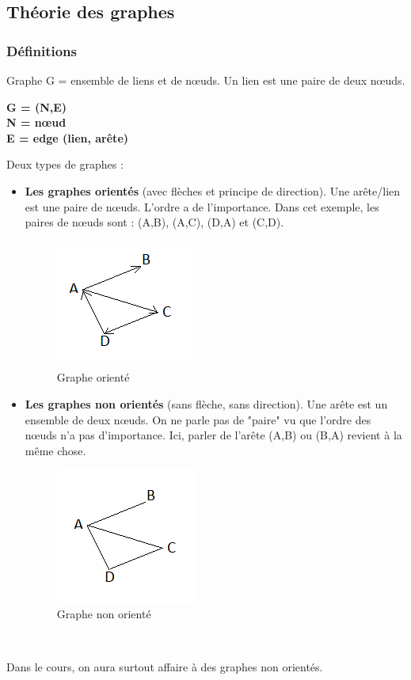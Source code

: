 \subsection{Théorie des graphes}
\subsubsection{Définitions\\}
Graphe G = ensemble de liens et de nœuds. Un lien est une paire de deux nœuds.
\begin{center}
\textbf{
G = (N,E)\\
N = nœud\\
E = edge (lien, arête)\\
}
\end{center}
Deux types de graphes :
\begin{itemize}

\item \textbf{Les graphes orientés} (avec flèches et principe de direction). Une arête/lien est une paire de nœuds. L'ordre a de l'importance. Dans cet exemple, les paires de nœuds sont : (A,B), (A,C), (D,A) et (C,D). 
\begin{figure}[!h]
\centering
\includegraphics[scale=1]{images/17_oriente.png}
\caption{Graphe orienté}
\end{figure}
\item \textbf{Les graphes non orientés} (sans flèche, sans direction). Une arête est un ensemble de deux nœuds. On ne parle pas de "paire" vu que l'ordre des nœuds n'a pas d'importance. Ici, parler de l'arête (A,B) ou (B,A) revient à la même chose.
\begin{figure}[!h]
\centering
\includegraphics[scale=1]{images/17_non-oriente.png}
\caption{Graphe non orienté}
\end{figure}
\\
\end{itemize}
Dans le cours, on aura surtout affaire à des graphes non orientés.

